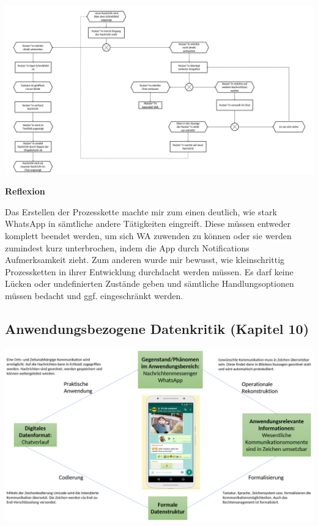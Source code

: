 \documentclass[
  a4paper,
]{book}
\begin{document}
\begin{center}\includegraphics{Figures/09-Bsp.2unten} \end{center}

\textbf{Reflexion}

Das Erstellen der Prozesskette machte mir zum einen deutlich, wie stark WhatsApp in sämtliche andere Tätigkeiten eingreift. Diese müssen entweder komplett beendet werden, um sich WA zuwenden zu können oder sie werden zumindest kurz unterbrochen, indem die App durch Notifications Aufmerksamkeit zieht. Zum anderen wurde mir bewusst, wie kleinschrittig Prozessketten in ihrer Entwicklung durchdacht werden müssen. Es darf keine Lücken oder undefinierten Zustände geben und sämtliche Handlungsoptionen müssen bedacht und ggf. eingeschränkt werden.

\subsection*{Anwendungsbezogene Datenkritik (Kapitel 10)}\label{anwendungsbezogene-datenkritik-kapitel-10-1}

\begin{center}\includegraphics{Figures/10-Bsp.2} \end{center}
\end{document}
